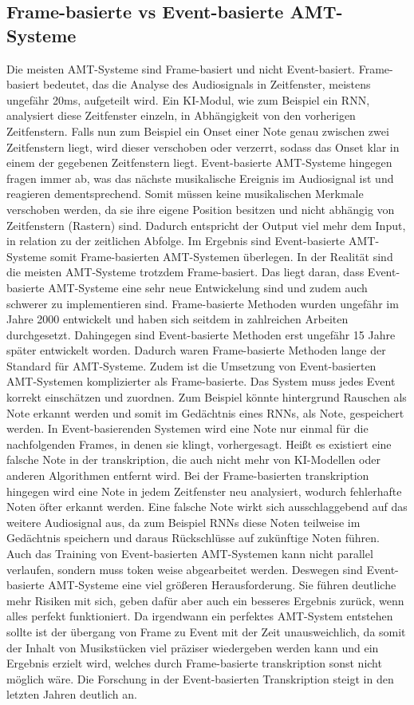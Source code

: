 \subsection{Frame-basierte vs Event-basierte AMT-Systeme}
Die meisten AMT-Systeme sind Frame-basiert und nicht Event-basiert.
Frame-basiert bedeutet, das die Analyse des Audiosignals in Zeitfenster, meistens ungefähr 20ms, aufgeteilt wird.
Ein KI-Modul, wie zum Beispiel ein RNN, analysiert diese Zeitfenster einzeln,
in Abhängigkeit von den vorherigen Zeitfenstern.
Falls nun zum Beispiel ein Onset einer Note genau zwischen zwei Zeitfenstern liegt,
wird dieser verschoben oder verzerrt, sodass das Onset klar in einem der gegebenen Zeitfenstern liegt.
Event-basierte AMT-Systeme hingegen fragen immer ab,
was das nächste musikalische Ereignis im Audiosignal ist und reagieren dementsprechend.
Somit müssen keine musikalischen Merkmale verschoben werden,
da sie ihre eigene Position besitzen und nicht abhängig von Zeitfenstern (Rastern) sind.
Dadurch entspricht der Output viel mehr dem Input, in relation zu der zeitlichen Abfolge.
Im Ergebnis sind Event-basierte AMT-Systeme somit Frame-basierten AMT-Systemen überlegen.
In der Realität sind die meisten AMT-Systeme trotzdem Frame-basiert.
Das liegt daran, dass Event-basierte AMT-Systeme eine sehr neue Entwickelung sind
und zudem auch schwerer zu implementieren sind.
Frame-basierte Methoden wurden ungefähr im Jahre 2000 entwickelt
und haben sich seitdem in zahlreichen Arbeiten durchgesetzt.
\cite{Martin1996, klapuri1998automatic}
Dahingegen sind Event-basierte Methoden erst ungefähr 15 Jahre später entwickelt worden.
\cite{performance_rnn2017event}
Dadurch waren Frame-basierte Methoden lange der Standard für AMT-Systeme.
Zudem ist die Umsetzung von Event-basierten AMT-Systemen komplizierter als Frame-basierte.
Das System muss jedes Event korrekt einschätzen und zuordnen.
Zum Beispiel könnte hintergrund Rauschen als Note erkannt werden und somit im
Gedächtnis eines RNNs, als Note, gespeichert werden.
In Event-basierenden Systemen wird eine Note nur einmal für die nachfolgenden Frames, in denen sie klingt, vorhergesagt.
Heißt es existiert eine falsche Note in der transkription,
die auch nicht mehr von KI-Modellen oder anderen Algorithmen entfernt wird.
Bei der Frame-basierten transkription hingegen wird eine Note in jedem Zeitfenster neu analysiert,
wodurch fehlerhafte Noten öfter erkannt werden.
Eine falsche Note wirkt sich ausschlaggebend auf das weitere Audiosignal aus,
da zum Beispiel RNNs diese Noten teilweise im Gedächtnis speichern und daraus Rückschlüsse auf zukünftige Noten führen.
Auch das Training von Event-basierten AMT-Systemen kann nicht parallel verlaufen,
sondern muss token weise abgearbeitet werden.
Deswegen sind Event-basierte AMT-Systeme eine viel größeren Herausforderung.
Sie führen deutliche mehr Risiken mit sich, geben dafür aber auch ein besseres Ergebnis zurück, wenn alles perfekt funktioniert.
Da irgendwann ein perfektes AMT-System entstehen sollte ist der übergang von
Frame zu Event mit der Zeit unausweichlich, da somit der Inhalt von Musikstücken
viel präziser wiedergeben werden kann und ein Ergebnis erzielt wird,
welches durch Frame-basierte transkription sonst nicht möglich wäre.
Die Forschung in der Event-basierten Transkription steigt in den letzten Jahren deutlich an.

